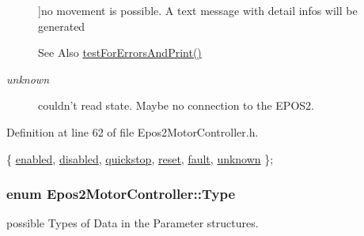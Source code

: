 \begin{Desc}
\begin{description}
{}]no movement is possible. A text message with detail infos will be generated \begin{DoxySeeAlso}{See Also}
\hyperlink{classEpos2MotorController_a481615a590e6d1c6bf6c39c426e6d9a6}{test\-For\-Errors\-And\-Print()} 
\end{DoxySeeAlso}
\item[{\em 
\hypertarget{classEpos2MotorController_ab5ec630dfbb90ad674e311187926060cad38c41836bbe157863e3eae0d308b7ca}{unknown}\label{classEpos2MotorController_ab5ec630dfbb90ad674e311187926060cad38c41836bbe157863e3eae0d308b7ca}
}]couldn't read state. Maybe no connection to the E\-P\-O\-S2. \end{description}
\end{Desc}



Definition at line 62 of file Epos2\-Motor\-Controller.\-h.


\begin{DoxyCode}
        \{
            \hyperlink{classEpos2MotorController_ab5ec630dfbb90ad674e311187926060cae6493e2426163b114bea951ab9a419d5}{enabled}, 
            \hyperlink{classEpos2MotorController_ab5ec630dfbb90ad674e311187926060caf0eea74682d3d3f21bec6e5b376cf443}{disabled},   
            \hyperlink{classEpos2MotorController_ab5ec630dfbb90ad674e311187926060caa83d02e81212676710b3c6d97cb30119}{quickstop}, 
            \hyperlink{classEpos2MotorController_ab5ec630dfbb90ad674e311187926060cae80551bbe5d91631014d56926de2d402}{reset}, 
            \hyperlink{classEpos2MotorController_ab5ec630dfbb90ad674e311187926060ca9c2b33ebbe5a72ad6d09d6af6531237c}{fault}, 
            \hyperlink{classEpos2MotorController_ab5ec630dfbb90ad674e311187926060cad38c41836bbe157863e3eae0d308b7ca}{unknown}  
        \};
\end{DoxyCode}
\hypertarget{classEpos2MotorController_a5404c60266e24bb6c0ce60153ddcb774}{
\subsubsection[{Type}]{\setlength{\rightskip}{0pt plus 5cm}enum {\bf Epos2\-Motor\-Controller\-::\-Type}}}\label{classEpos2MotorController_a5404c60266e24bb6c0ce60153ddcb774}


possible Types of Data in the Parameter structures. 


